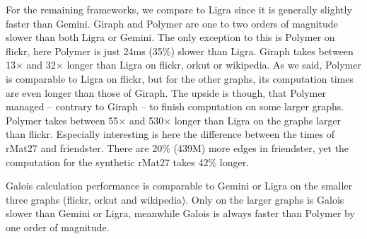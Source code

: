 For the remaining frameworks, we compare to Ligra since it is generally slightly faster than Gemini.
Giraph and Polymer are one to two orders of magnitude slower than both Ligra or Gemini. The only exception to this is Polymer on flickr, here Polymer is just 24ms (35\%) slower than Ligra.
Giraph takes between 13$\times$ and 32$\times$ longer than Ligra on flickr, orkut or wikipedia.
As we said, Polymer is comparable to Ligra on flickr, but for the other graphs, its computation times are even longer than those of Giraph. The upside is though, that Polymer managed -- contrary to Giraph -- to finish computation on some larger graphs.
Polymer takes between 55$\times$ and 530$\times$ longer than Ligra on the graphs larger than flickr.
Especially interesting is here the difference between the times of rMat27 and friendster. There are 20\% (439M) more edges in friendster, yet the computation for the synthetic rMat27 takes 42\% longer.

Galois calculation performance is comparable to Gemini or Ligra on the smaller three graphs (flickr, orkut and wikipedia).
Only on the larger graphs is Galois slower than Gemini or Ligra, meanwhile Galois is always faster than Polymer by one order of magnitude.

